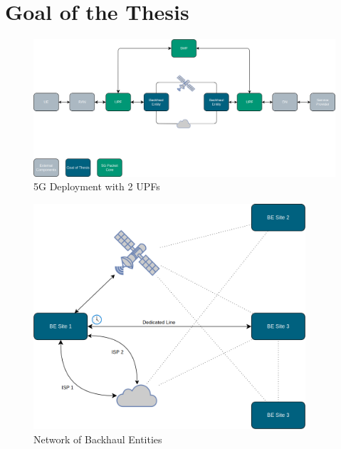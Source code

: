 
\section{Goal of the Thesis}
\label{sec:goal}

\begin{figure}[h]
    \centering
        \includegraphics[width=\textwidth]{fig/telco-use-case-2.png}
        \caption{5G Deployment with 2 UPFs}
        \label{fig:telco}
\end{figure}


\begin{figure}[h]
    \centering
        \includegraphics[width=0.9\textwidth, height=0.75\textwidth]{fig/mesh_network.png}
        \caption{Network of Backhaul Entities}
        \label{fig:mesh}
\end{figure}

